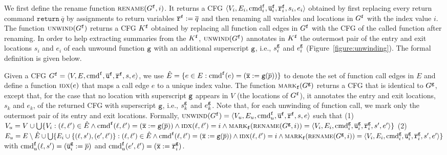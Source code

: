 We first define the rename function $\textsc{rename}(G^{\mathtt{{f}}},i)$. It returns a CFG $\langle V_i, E_i,\textmd{cmd}_i^{\mathtt{{f}}}, \overline{\texttt{u}}_i^{\mathtt{{f}}}, \overline{\texttt{r}}_i^{\mathtt{{f}}},s_i,e_i \rangle$ obtained by first replacing every return command $\mathtt{return}\ \overline{q}$ by assignments to return variables $\overline{\texttt{r}}^{\mathtt{{f}}} := \overline{q}$ and then renaming all variables and locations in $G^{\mathtt{{f}}}$ with the index value $i$. The function $\textsc{unwind}(G^{\mathtt{{f}}})$ returns a CFG $K^{\mathtt{{f}}}$ obtained by replacing all function call edges in $G^{\mathtt{{f}}}$ with the CFG of the called function after renaming. In order to help extracting summaries from the $K^{\mathtt{{f}}}$, $\textsc{unwind}(G^{\mathtt{{f}}})$ annotates in $K^{\mathtt{{f}}}$ the outermost pair of the entry and exit locations ${s_i}$ and ${e_i}$ of each unwound function $\mathtt{{g}}$ with an additional superscript $\mathtt{{g}}$, i.e., $s_i^{\mathtt{{g}}}$ and $e_i^{\mathtt{{g}}}$ (Figure~\ref{figure:unwinding}). The formal definition is given below.

Given a CFG $G^{\mathtt{{f}}}=\langle
V, E,\textmd{cmd}^{\mathtt{{f}}}, \overline{\texttt{u}}^{\mathtt{{f}}}, \overline{\texttt{r}}^{\mathtt{{f}}},s,e \rangle$,
we use $\hat{E} =\{e\in E: \textmd{cmd}^{\mathtt{{f}}} (e)= (\overline{\texttt{x}}:=\mathtt{g}(\overline{p}))\}$ to denote the set of function call edges in $E$ and define a function $\textsc{idx}(e)$ that maps a call edge $e$ to a unique index value.
The function $\textsc{mark}_{\mathtt{{f}}}(G^{\mathtt{{g}}})$ returns a CFG that is identical to $G^{\mathtt{{g}}}$, except that, for the case that no location with superscript $\mathtt{{g}}$ appears in $V$ (the locations of $G^{\mathtt{{f}}}$), it annotates the entry and exit locations, $s_k$ and $e_k$, of the returned CFG with superscript $\mathtt{{g}}$, i.e., $s_k^{\mathtt{{g}}}$ and $e_k^{\mathtt{{g}}}$. Note that, for each unwinding of function call, we mark only the outermost pair of its entry and exit locations.
Formally, $\textsc{unwind}(G^{\mathtt{{f}}}) = \langle V_u, E_u,\textmd{cmd}_u^{\mathtt{{f}}}, \overline{\texttt{u}}^{\mathtt{{f}}}, \overline{\texttt{r}}^{\mathtt{{f}}},s,e \rangle$ such that 
(1) $V_u = V\cup \bigcup\{V_i:(\ell, \ell')\in \hat{E} \wedge \textmd{cmd}^{\mathtt{{f}}}(\ell, \ell')=(\overline{\texttt{x}}:=\mathtt{g}(\overline{p}))\wedge \textsc{idx}(\ell, \ell')=i \wedge 
\textsc{mark}_{\mathtt{{f}}}(\textsc{rename}(G^{\mathtt{{g}}},i))=
\langle V_i, E_i,\textmd{cmd}^{\mathtt{{g}}}_i, \overline{\texttt{u}}^{\mathtt{{g}}}_i, \overline{\texttt{r}}^{\mathtt{{g}}}_i,s',e'\rangle \}$ 
(2) $E_u= E \setminus \hat{E} \cup \bigcup\{E_i\cup\{(\ell, s'),(e', \ell')\}: (\ell, \ell')\in \hat{E} \wedge 
\textmd{cmd}^{\mathtt{{f}}}(\ell, \ell')=(\overline{\texttt{x}}:=\mathtt{g}(\overline{p}))\wedge \textsc{idx}(\ell, \ell')=i \wedge 
\textsc{mark}_{\mathtt{{f}}}(\textsc{rename}(G^{\mathtt{{g}}},i))=
\langle V_i, E_i,\textmd{cmd}^{\mathtt{{g}}}_i, \overline{\texttt{u}}^{\mathtt{{g}}}_i, \overline{\texttt{r}}^{\mathtt{{g}}}_i,s',e'\rangle \}$ with $\textmd{cmd}_u^{\mathtt{{f}}} (\ell, s') = (\overline{\texttt{u}}_i^{\mathtt{{g}}}:=\overline{p})$ and $\textmd{cmd}_u^{\mathtt{{f}}} (e', \ell') = (\overline{\texttt{x}}:=\overline{\texttt{r}}^{\mathtt{{g}}}_i)$.


